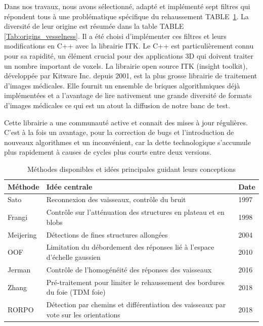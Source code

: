 Dans nos travaux, nous avons sélectionné, adapté et implémenté sept filtres qui répondent tous à une problématique spécifique du rehaussement TABLE~\ref{Tab:available_vesselness}. La diversité de leur origine est résumée dans la table TABLE~ \ref{Tab:origins_vesselness}. Il a été choisi d'implémenter ces filtres et leurs modifications en C++ avec la librairie ITK. Le C++ est particulièrement connu pour sa rapidité, un élément crucial pour des applications 3D qui doivent traiter un nombre important de voxels. La librairie open source ITK (insight toolkit), développée par Kitware Inc. depuis 2001, est la plus grosse librairie de traitement d'images médicales. Elle fournit un ensemble de briques algorithmiques déjà implémentées et a l'avantage de lire nativement une grande diversité de formats d'images médicales ce qui est un atout la diffusion de notre banc de test.

Cette librairie a une communauté active et connait des mises à jour régulières. C'est à la fois un avantage, pour la correction de bugs et l'introduction de nouveaux algorithmes et un inconvénient, car la dette technologique s'accumule plus rapidement à causes de cycles plus courts entre deux versions.


\begin{table}
    \begin{center}
  \begin{tabular}{l|l|l}
  Méthode   &  Idée centrale                                                                       & Date \\ \hline  \hline 
  Sato      & Reconnexion des vaisseaux, contrôle du bruit                                         & 1997 \\ \hline
  Frangi    & Contrôle sur l'atténuation des structures en plateau et en blobs                     & 1998 \\ \hline
  Meijering & Détections de fines structures allongées                                             & 2004 \\ \hline
  OOF       & Limitation du débordement des réponses lié à l'espace d'échelle gaussien             & 2010 \\ \hline
  Jerman    & Contrôle de l'homogénéité des réponses des vaisseaux                                 & 2016 \\ \hline
  Zhang     & Pré-traitement pour limiter le rehaussement des bordures du foie (TDM foie)          & 2018 \\ \hline
  RORPO     & Détection par chemins et différentiation des vaisseaux par vote sur les orientations & 2018  
  \end{tabular}
  \end{center}
  \caption{Méthodes disponibles et idées principales guidant leurs conceptions}
  \label{Tab:available_vesselness}

  \end{table}

